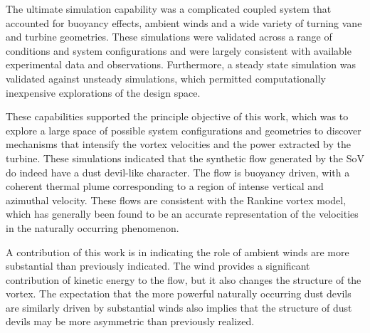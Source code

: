 The ultimate simulation capability was a complicated coupled system that
accounted for buoyancy effects, ambient winds and a wide variety of
turning vane and turbine geometries. These simulations were validated
across a range of conditions and system configurations and were largely
consistent with available experimental data and
observations. Furthermore, a steady state simulation was validated
against unsteady simulations, which permitted computationally
inexpensive explorations of the design space. 




These capabilities supported the principle objective of this work, which
was to explore a large space of possible system configurations and
geometries to discover mechanisms that intensify the vortex velocities
and the power extracted by the turbine. These simulations indicated that
the synthetic flow generated by the SoV do indeed have a dust
devil-like character. The flow is buoyancy driven, with a coherent
thermal plume corresponding to a region of intense vertical and
azimuthal velocity. These flows are consistent with the Rankine
vortex model, which has generally been found to be an accurate
representation of the velocities in the naturally occurring phenomenon. 

A contribution of this work is in indicating the role of
ambient winds are more substantial than previously indicated. The wind
provides a significant contribution of kinetic energy to the flow, but it
also changes the structure of the vortex. The expectation that the more
powerful naturally occurring dust devils are similarly driven by substantial 
winds also implies that the structure of dust devils may be more 
asymmetric than previously realized. 


